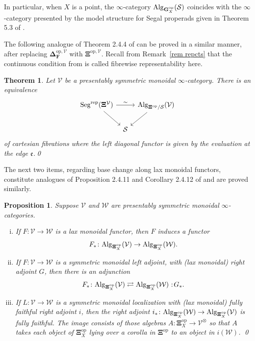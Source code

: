 \documentclass{amsart}
\numberwithin{theorem}{subsection}
\newtheorem{thm}[theorem]{Theorem}
\newtheorem{propn}[theorem]{Proposition}
\theoremstyle{definition}
\providecommand{\op}{\mathrm{op}}
\newcommand{\finsetskel}{\mathbf{F}}
\newcommand{\xS}{\mathcal{S}}
\newcommand{\xV}{\mathcal{V}}
\newcommand{\xW}{\mathcal{W}}
\newcommand{\xfe}{\mathfrak{e}}
\newcommand*\cocolon{%
	\nobreak
	\mskip6mu plus1mu
	\mathpunct{}%
	\nonscript
	\mkern-\thinmuskip
	{:}%
	\mskip2mu
	\relax
}
\newcommand{\icat}{$\infty$-category}
\newcommand{\name}[1]{\ensuremath{\text{\textup{#1}}}}
\newcommand{\simp}{\mathbf{\Delta}}
\newcommand{\bbY}{\mathbf{G}}
\newcommand{\gc}{\mathbf{\Xi}}
\newcommand{\gcV}{\gc^{\xV}}
\newcommand{\opgcV}{\gc^{\op,\xV}}
\newcommand{\Seg}{\name{Seg}}
\newcommand{\Alg}{\name{Alg}}
\newcommand{\Segrep}{\Seg^{\name{rep}}}
\begin{document}
In particular, when $X$ is a point, the \icat{} $\Alg_{\bbY^\op_X}(\xS)$ coincides with the \icat{} presented by the model structure for Segal properads given in Theorem 5.3 of \cite{hry_factorizations}.

The following analogue of Theorem 2.4.4 of \cite{ChuHaugseng} can be proved in a similar manner, after replacing $\simp_{\finsetskel}^{\op, \xV}$ with $\opgcV$.
Recall from Remark~\ref{rem repcts} that the continuous condition from \cite{ChuHaugseng} is called fibrewise representability here.
\begin{thm}\label{thm:PCSisAlgLT}
	Let $\xV$ be a presentably symmetric monoidal \icat{}. There is an equivalence 
	\[
 \begin{tikzcd}[column sep=tiny]
  \Segrep(\gcV)\arrow{dr} \arrow{rr}{\sim} &
    & \Alg_{\gc^\op/\xS}(\xV) \arrow{dl} \\
    & \xS
 \end{tikzcd}
 \]
of cartesian fibrations where the left diagonal functor is given by the evaluation at the edge $\xfe$.\qed
\end{thm}

The next two items, regarding base change along lax monoidal functors, constitute analogues of Proposition 2.4.11 and Corollary 2.4.12 of \cite{ChuHaugseng} and are proved similarly.

\begin{propn}
Suppose $\xV$ and $\xW$ are presentably symmetric monoidal $\infty$-categories.
	\begin{enumerate}[(i)]
		\item If $F \colon \xV \to \xW$ is a lax monoidal functor, then $F$ induces a functor \[F_{*} \colon \Alg_{\gc^\op_X}(\xV) \to \Alg_{\gc^\op_X}(\xW).\]
		\item If $F \colon \xV \to \xW$ is a symmetric monoidal left adjoint, with (lax monoidal) right adjoint $G$, then there is an adjunction
		\[ F_{*} \colon \Alg_{\gc^\op_X}(\xV) \rightleftarrows \Alg_{\gc^\op_X}(\xW)\cocolon G_{*}.\]
		\item If $L \colon \xV \to \xW$ is a symmetric monoidal localization with (lax monoidal) fully faithful right adjoint $i$, then the right adjoint $i_{*} \colon \Alg_{\gc^\op_X}(\xW) \to \Alg_{\gc^\op_X}(\xV)$ is fully faithful.
		The image consists of those algebras $A \colon \gc^\op_X \to \xV^\otimes$ so that $A$ takes each object of $\gc^\op_X$ lying over a corolla in $\gc^\op$ to an object in $i(\xW)$. \qed
	\end{enumerate}
\end{propn}
\end{document}
